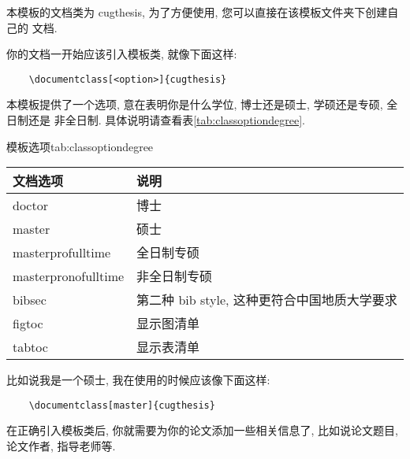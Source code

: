\documentclass[bibsec, doctor, tabtoc, figtoc]{cugthesis}
\begin{document}
本模板的文档类为 cugthesis, 为了方便使用, 您可以直接在该模板文件夹下创建自己的
文档.

你的文档一开始应该引入模板类, 就像下面这样:
\begin{verbatim}
    \documentclass[<option>]{cugthesis}
\end{verbatim}

本模板提供了一个选项, 意在表明你是什么学位, 博士还是硕士, 学硕还是专硕, 全日制还是
非全日制. 具体说明请查看表\ref{tab:classoptiondegree}.

\begin{ttab}{模板选项}{tab:classoptiondegree}
    \begin{tabular}{ll}
        \toprule
        文档选项            & 说明                                         \\
        \midrule
        doctor              & 博士                                         \\
        master              & 硕士                                         \\
        masterprofulltime   & 全日制专硕                                   \\
        masterpronofulltime & 非全日制专硕                                 \\
        bibsec              & 第二种 bib style, 这种更符合中国地质大学要求 \\
        figtoc              & 显示图清单                                   \\
        tabtoc              & 显示表清单                                   \\
        \bottomrule
    \end{tabular}
\end{ttab}

比如说我是一个硕士, 我在使用的时候应该像下面这样:
\begin{verbatim}
    \documentclass[master]{cugthesis}
\end{verbatim}

在正确引入模板类后, 你就需要为你的论文添加一些相关信息了, 比如说论文题目, 论文作者,
指导老师等.
\end{document}
